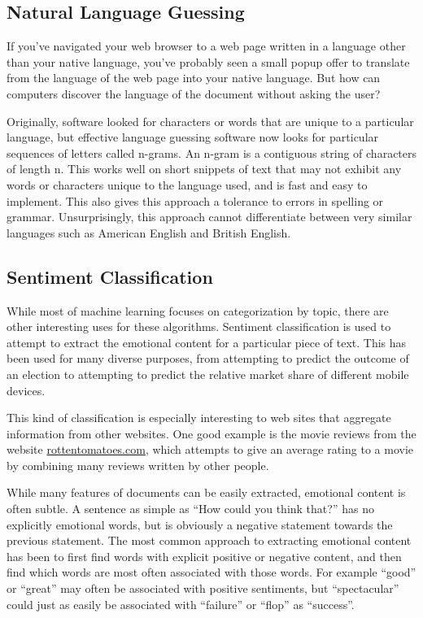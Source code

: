 \documentclass[12pt]{article}
\begin{document}
\subsection{Natural Language Guessing}
If you've navigated your web browser to a web page written in a language other than your native language,
you've probably seen a small popup offer to translate from the language of the web page into your native
language. But how can computers discover the language of the document without asking the user?

Originally, software looked for characters or words that are unique to a particular language, but effective
language guessing software now looks for particular sequences of letters called n-grams. An n-gram is a
contiguous string of characters of length n. This works well on short snippets of text that may not exhibit
any words or characters unique to the language used, and is fast and easy to implement. This also gives this
approach a tolerance to errors in spelling or grammar. Unsurprisingly, this approach cannot differentiate
between very similar languages such as American English and British English. \citep{martins2005language}
\subsection{Sentiment Classification}
While most of machine learning focuses on categorization by topic, there are other interesting uses for these
algorithms.  Sentiment classification is used to attempt to extract the emotional content for a particular
piece of text. This has been used for many diverse purposes, from attempting to predict the outcome of an
election to attempting to predict the relative market share of different mobile devices.

This kind of classification is especially interesting to web sites that aggregate information from other
websites. One good example is the movie reviews from the website \url{rottentomatoes.com}, which attempts to
give an average rating to a movie by combining many reviews written by other people. \citep{pang2002thumbs}

While many features of documents can be easily extracted, emotional content is often subtle. A sentence as
simple as ``How could you think that?'' has no explicitly emotional words, but is obviously a negative
statement towards the previous statement. The most common approach to extracting emotional content has been to
first find words with explicit positive or negative content, and then find which words are most often
associated with those words. For example ``good'' or ``great'' may often be associated with positive
sentiments, but ``spectacular'' could just as easily be associated with ``failure'' or ``flop'' as
``success''.
\end{document}

